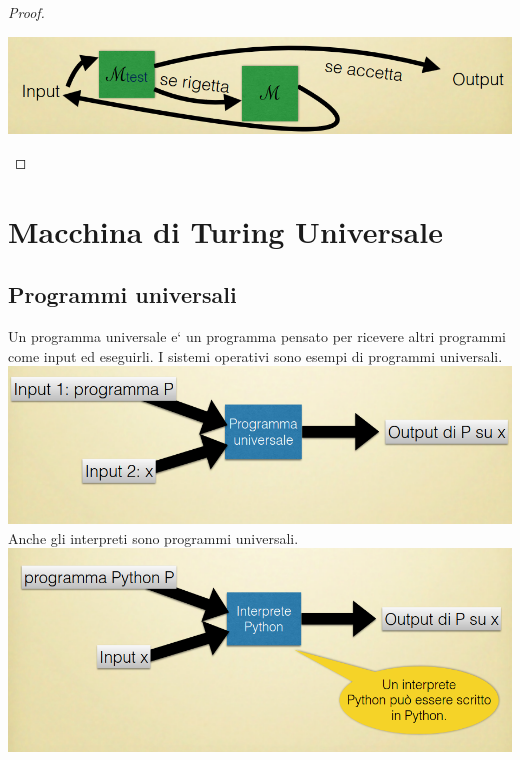 \documentclass[a4paper, 12pt]{article}
\begin{document}
\begin{proof}
\begin{enumerate}
\begin{itemize}
	\begin{center}
	\includegraphics[scale=0.4]{while3.png}
	\end{center}
	\end{itemize}
\end{enumerate}
\end{proof}

\section{Macchina di Turing Universale}
\subsection{Programmi universali} 
Un programma universale e` un programma pensato per ricevere altri programmi come input ed eseguirli. I sistemi operativi sono esempi di programmi universali.\\
\includegraphics[scale=0.5]{programmi_universali.png}
Anche gli interpreti sono programmi universali.\\
\includegraphics[scale=0.5]{interpreti_programmi_universali.png}
\end{document}
